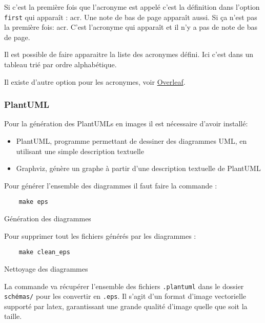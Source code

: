 Si c'est la première fois que l'acronyme est appelé c'est la définition dans l'option \verb=first= qui apparaît : \gls{acr}.
Une note de bas de page apparaît aussi. \newline
Si ça n'est pas la première fois: \gls{acr}. C'est l'acronyme qui apparaît et il n'y a pas de note de bas de page. \newline

Il est possible de faire apparaitre la liste des acronymes défini. Ici c'est dans un tableau trié par ordre alphabétique.

\printglossary[type=\acronymtype,style=superheaderborder ,title={Définitions, acronymes et abréviations}]
\glsaddallunused \newline %


Il existe d'autre option pour les acronymes, voir \href{https://fr.overleaf.com/learn/latex/Glossaries}{Overleaf}.

\subsubsection{PlantUML}
Pour la génération des PlantUMLs en images il est nécessaire d'avoir installé:
\begin{itemize}
    \item PlantUML, programme permettant de dessiner des diagrammes UML, en utilisant une simple description textuelle
    \item Graphviz, génère un graphe à partir d'une description textuelle de PlantUML
\end{itemize}

Pour générer l'ensemble des diagrammes il faut faire la commande :
\begin{code}
    \begin{verbatim}
    make eps
\end{verbatim}
    \caption{Génération des diagrammes}
\end{code}

Pour supprimer tout les fichiers générés par les diagrammes :
\begin{code}
    \begin{verbatim}
    make clean_eps
\end{verbatim}
    \caption{Nettoyage des diagrammes}
\end{code}

La commande va récupérer l'ensemble des fichiers \verb=.plantuml=
dans le dossier \verb=schémas/= pour les convertir en \verb=.eps=.
Il s'agit d'un format d'image vectorielle supporté par \gls{latex},
garantissant une grande qualité d'image quelle que soit la taille.

